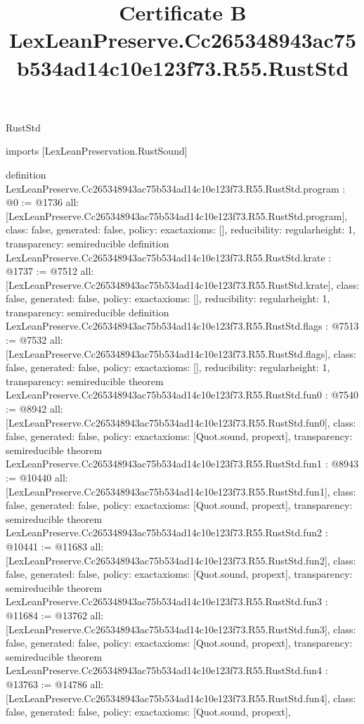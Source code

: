 \begin{lexlean}{RustStd}
\title{Certificate B LexLeanPreserve.Cc265348943ac75b534ad14c10e123f73.R55.RustStd}
\begin{coremodule}
imports [LexLeanPreservation.RustSound]

definition LexLeanPreserve.Cc265348943ac75b534ad14c10e123f73.R55.RustStd.program : @0 := @1736 {
  all: [LexLeanPreserve.Cc265348943ac75b534ad14c10e123f73.R55.RustStd.program],
  class: false,
  generated: false,
  policy: exact{axioms: []},
  reducibility: regular{height: 1},
  transparency: semireducible
}
definition LexLeanPreserve.Cc265348943ac75b534ad14c10e123f73.R55.RustStd.krate : @1737 := @7512 {
  all: [LexLeanPreserve.Cc265348943ac75b534ad14c10e123f73.R55.RustStd.krate],
  class: false,
  generated: false,
  policy: exact{axioms: []},
  reducibility: regular{height: 1},
  transparency: semireducible
}
definition LexLeanPreserve.Cc265348943ac75b534ad14c10e123f73.R55.RustStd.flags : @7513 := @7532 {
  all: [LexLeanPreserve.Cc265348943ac75b534ad14c10e123f73.R55.RustStd.flags],
  class: false,
  generated: false,
  policy: exact{axioms: []},
  reducibility: regular{height: 1},
  transparency: semireducible
}
theorem LexLeanPreserve.Cc265348943ac75b534ad14c10e123f73.R55.RustStd.fun0 : @7540 := @8942 {
  all: [LexLeanPreserve.Cc265348943ac75b534ad14c10e123f73.R55.RustStd.fun0],
  class: false,
  generated: false,
  policy: exact{axioms: [Quot.sound, propext]},
  transparency: semireducible
}
theorem LexLeanPreserve.Cc265348943ac75b534ad14c10e123f73.R55.RustStd.fun1 : @8943 := @10440 {
  all: [LexLeanPreserve.Cc265348943ac75b534ad14c10e123f73.R55.RustStd.fun1],
  class: false,
  generated: false,
  policy: exact{axioms: [Quot.sound, propext]},
  transparency: semireducible
}
theorem LexLeanPreserve.Cc265348943ac75b534ad14c10e123f73.R55.RustStd.fun2 : @10441 := @11683 {
  all: [LexLeanPreserve.Cc265348943ac75b534ad14c10e123f73.R55.RustStd.fun2],
  class: false,
  generated: false,
  policy: exact{axioms: [Quot.sound, propext]},
  transparency: semireducible
}
theorem LexLeanPreserve.Cc265348943ac75b534ad14c10e123f73.R55.RustStd.fun3 : @11684 := @13762 {
  all: [LexLeanPreserve.Cc265348943ac75b534ad14c10e123f73.R55.RustStd.fun3],
  class: false,
  generated: false,
  policy: exact{axioms: [Quot.sound, propext]},
  transparency: semireducible
}
theorem LexLeanPreserve.Cc265348943ac75b534ad14c10e123f73.R55.RustStd.fun4 : @13763 := @14786 {
  all: [LexLeanPreserve.Cc265348943ac75b534ad14c10e123f73.R55.RustStd.fun4],
  class: false,
  generated: false,
  policy: exact{axioms: [Quot.sound, propext]},
}
\end{coremodule}
\end{lexlean}
